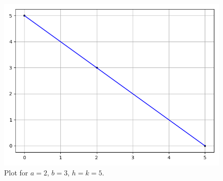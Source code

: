 \documentclass[journal,12pt,twocolumn]{IEEEtran}
\begin{document}
\begin{enumerate}
\begin{table}[!ht]
        \centering
        
        \caption{Input parameters used in the construction of Fig. \ref{fig:example}.}
        \label{tab:param}
    \end{table}
    \begin{figure}[!ht]
        \centering
        \includegraphics[width=\columnwidth]{figs/intercept.png}
        \caption{Plot for $a = 2$, $b = 3$, $h = k = 5$.}
        \label{fig:example}
    \end{figure}
\end{enumerate}
\end{document}
